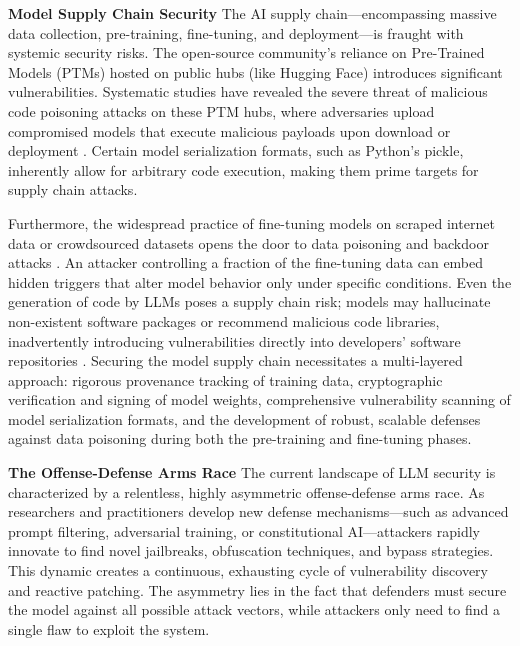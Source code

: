 \documentclass[11pt,a4paper]{article}
\begin{document}
\textbf{Model Supply Chain Security}
The AI supply chain---encompassing massive data collection, pre-training, fine-tuning, and deployment---is fraught with systemic security risks. The open-source community's reliance on Pre-Trained Models (PTMs) hosted on public hubs (like Hugging Face) introduces significant vulnerabilities. Systematic studies have revealed the severe threat of malicious code poisoning attacks on these PTM hubs, where adversaries upload compromised models that execute malicious payloads upon download or deployment . Certain model serialization formats, such as Python's pickle, inherently allow for arbitrary code execution, making them prime targets for supply chain attacks.

Furthermore, the widespread practice of fine-tuning models on scraped internet data or crowdsourced datasets opens the door to data poisoning and backdoor attacks \cite{Hao_2024_Exploring}. An attacker controlling a fraction of the fine-tuning data can embed hidden triggers that alter model behavior only under specific conditions. Even the generation of code by LLMs poses a supply chain risk; models may hallucinate non-existent software packages or recommend malicious code libraries, inadvertently introducing vulnerabilities directly into developers' software repositories \cite{Noever_2024_AI}. Securing the model supply chain necessitates a multi-layered approach: rigorous provenance tracking of training data, cryptographic verification and signing of model weights, comprehensive vulnerability scanning of model serialization formats, and the development of robust, scalable defenses against data poisoning during both the pre-training and fine-tuning phases.

\textbf{The Offense-Defense Arms Race}
The current landscape of LLM security is characterized by a relentless, highly asymmetric offense-defense arms race. As researchers and practitioners develop new defense mechanisms---such as advanced prompt filtering, adversarial training, or constitutional AI---attackers rapidly innovate to find novel jailbreaks, obfuscation techniques, and bypass strategies. This dynamic creates a continuous, exhausting cycle of vulnerability discovery and reactive patching. The asymmetry lies in the fact that defenders must secure the model against all possible attack vectors, while attackers only need to find a single flaw to exploit the system.
\end{document}
